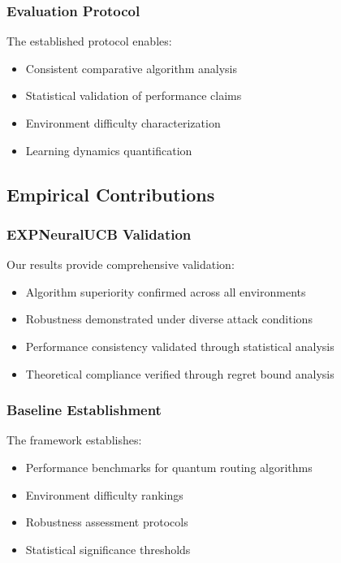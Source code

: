 \documentclass[11pt,a4paper]{article}
\begin{document}
\subsubsection{Evaluation Protocol}

The established protocol enables:
\begin{itemize}
\item Consistent comparative algorithm analysis
\item Statistical validation of performance claims
\item Environment difficulty characterization
\item Learning dynamics quantification
\end{itemize}

\subsection{Empirical Contributions}

\subsubsection{EXPNeuralUCB Validation}

Our results provide comprehensive validation:
\begin{itemize}
\item Algorithm superiority confirmed across all environments
\item Robustness demonstrated under diverse attack conditions
\item Performance consistency validated through statistical analysis
\item Theoretical compliance verified through regret bound analysis
\end{itemize}

\subsubsection{Baseline Establishment}

The framework establishes:
\begin{itemize}
\item Performance benchmarks for quantum routing algorithms
\item Environment difficulty rankings
\item Robustness assessment protocols
\item Statistical significance thresholds
\end{itemize}
\end{document}
